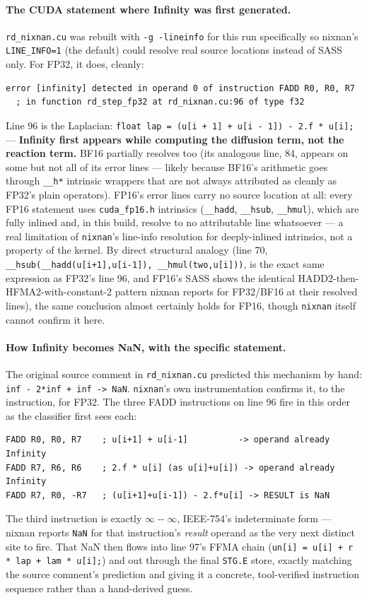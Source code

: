 \documentclass[11pt]{article}
\begin{document}
\paragraph{The CUDA statement where Infinity was first generated.} \texttt{rd\_nixnan.cu}
was rebuilt with \texttt{-g -lineinfo} for this run specifically so nixnan's
\texttt{LINE\_INFO=1} (the default) could resolve real source locations instead of SASS
only. For FP32, it does, cleanly:
\begin{lstlisting}
error [infinity] detected in operand 0 of instruction FADD R0, R0, R7
  ; in function rd_step_fp32 at rd_nixnan.cu:96 of type f32
\end{lstlisting}
Line 96 is the Laplacian: \texttt{float lap = (u[i + 1] + u[i - 1]) - 2.f * u[i];} ---
\textbf{Infinity first appears while computing the diffusion term, not the reaction
term.} BF16 partially resolves too (its analogous line, 84, appears on some but not all
of its error lines --- likely because BF16's arithmetic goes through \texttt{\_\_h*}
intrinsic wrappers that are not always attributed as cleanly as FP32's plain operators).
FP16's error lines carry no source location at all: every FP16 statement uses
\texttt{cuda\_fp16.h} intrinsics (\texttt{\_\_hadd}, \texttt{\_\_hsub}, \texttt{\_\_hmul}),
which are fully inlined and, in this build, resolve to no attributable line whatsoever ---
a real limitation of \texttt{nixnan}'s line-info resolution for deeply-inlined intrinsics,
not a property of the kernel. By direct structural analogy (line 70,
\texttt{\_\_hsub(\_\_hadd(u[i+1],u[i-1]), \_\_hmul(two,u[i]))}, is the exact same
expression as FP32's line 96, and FP16's SASS shows the identical
HADD2-then-HFMA2-with-constant-2 pattern nixnan reports for FP32/BF16 at their resolved
lines), the same conclusion almost certainly holds for FP16, though \texttt{nixnan}
itself cannot confirm it here.

\paragraph{How Infinity becomes NaN, with the specific statement.} The original source
comment in \texttt{rd\_nixnan.cu} predicted this mechanism by hand:
\texttt{inf - 2*inf + inf -> NaN}. \texttt{nixnan}'s own instrumentation confirms it, to
the instruction, for FP32. The three FADD instructions on line 96 fire in this order as
the classifier first sees each:
\begin{lstlisting}
FADD R0, R0, R7    ; u[i+1] + u[i-1]          -> operand already Infinity
FADD R7, R6, R6    ; 2.f * u[i] (as u[i]+u[i]) -> operand already Infinity
FADD R7, R0, -R7   ; (u[i+1]+u[i-1]) - 2.f*u[i] -> RESULT is NaN
\end{lstlisting}
The third instruction is exactly $\infty - \infty$, IEEE-754's indeterminate form ---
nixnan reports \texttt{NaN} for that instruction's \emph{result} operand as the very next
distinct site to fire. That NaN then flows into line 97's FFMA chain
(\texttt{un[i] = u[i] + r * lap + lam * u[i];}) and out through the final
\texttt{STG.E} store, exactly matching the source comment's prediction and giving it a
concrete, tool-verified instruction sequence rather than a hand-derived guess.
\end{document}
